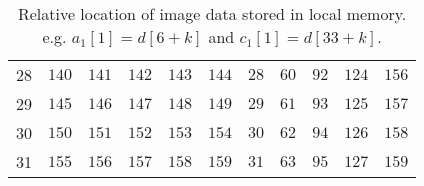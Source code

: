 \begin{table}[H]
\begin{tabular}{r|rrrrr|rrrrr}
        28 & $140$    & $141$    & $142$    & $143$    & $144$    & $28$     & $60$     & $92$     & $124$    & $156$    \\
        29 & $145$    & $146$    & $147$    & $148$    & $149$    & $29$     & $61$     & $93$     & $125$    & $157$    \\
        30 & $150$    & $151$    & $152$    & $153$    & $154$    & $30$     & $62$     & $94$     & $126$    & $158$    \\
        31 & $155$    & $156$    & $157$    & $158$    & $159$    & $31$     & $63$     & $95$     & $127$    & $159$
    \end{tabular}
    \caption{Relative location of image data stored in local memory. \newline e.g. \quad $a_1[1]=d[6+k]$ and  $c_1[1]=d[33+k]$.}
    \label{table:memory_index}
\end{table}
